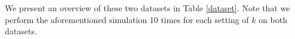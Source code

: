 \documentclass[twoside,leqno,twocolumn]{article}
\begin{document}
We present an overview of these two datasets in Table \ref{dataset}. Note that we perform the aforementioned simulation 10 times for each setting of $k$ on both datasets.
\begin{table}[t] 
\renewcommand\arraystretch{1.0}
	\centering
	\caption{Dataset Description.}  
 \setlength\tabcolsep{4.2pt}%
\vspace{-1.7em}
\label{dataset}
\end{table}
\end{document}
